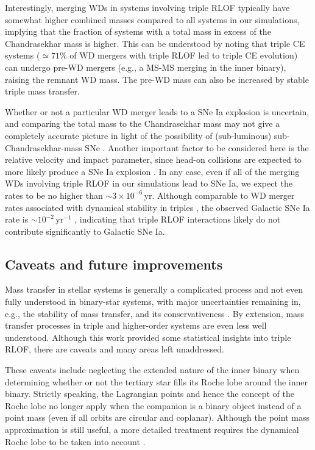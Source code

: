 \documentclass[twocolumn,appendixfloats,tighten]{aastex631}
\newcommand{\yr}{\mathrm{yr}}
\begin{document}
Interestingly, merging WDs in systems involving triple RLOF typically have somewhat higher combined masses compared to all systems in our simulations, implying that the fraction of systems with a total mass in excess of the Chandrasekhar mass is higher. This can be understood by noting that triple CE systems ($\simeq 71\%$ of WD mergers with triple RLOF led to triple CE evolution) can undergo pre-WD mergers (e.g., a MS-MS merging in the inner binary), raising the remnant WD mass. The pre-WD mass can also be increased by stable triple mass transfer. 

Whether or not a particular WD merger leads to a SNe Ia explosion is uncertain, and comparing the total mass to the Chandrasekhar mass may not give a completely accurate picture in light of the possibility of (sub-luminous) sub-Chandrasekhar-mass SNe \citep[e.g.,][]{2010ApJ...714L..52S,2012ApJ...747L..10P,2013ApJ...770L...8P,2021A&A...649A.155G}. Another important factor to be considered here is the relative velocity and impact parameter, since head-on collisions are expected to more likely produce a SNe Ia explosion \citep[e.g.,][]{2009ApJ...705L.128R,2016ApJ...826..169H}. In any case, even if all of the merging WDs involving triple RLOF in our simulations lead to SNe Ia, we expect the rates to be no higher than $\sim 3 \times 10^{-6}\,\yr$. Although comparable to WD merger rates associated with dynamical stability in triples \citep{2021arXiv210713620H}, the observed Galactic SNe Ia rate is $\sim 10^{-2}\,\yr^{-1}$ \citep{2013ApJ...778..164A}, indicating that triple RLOF interactions likely do not contribute significantly to Galactic SNe Ia. 

\subsection{Caveats and future improvements}
\label{sect:dis:cav}
Mass transfer in stellar systems is generally a complicated process and not even fully understood in binary-star systems, with major uncertainties remaining in, e.g., the stability of mass transfer, and its conservativeness \citep[e.g.,][]{2007A&A...467.1181D}. By extension, mass transfer processes in triple and higher-order systems are even less well understood. Although this work provided some statistical insights into triple RLOF, there are caveats and many areas left unaddressed. 

These caveats include neglecting the extended nature of the inner binary when determining whether or not the tertiary star fills its Roche lobe around the inner binary. Strictly speaking, the Lagrangian points and hence the concept of the Roche lobe no longer apply when the companion is a binary object instead of a point mass (even if all orbits are circular and coplanar). Although the point mass approximation is still useful, a more detailed treatment requires the dynamical Roche lobe to be taken into account \citep{2020MNRAS.491..495D}. 
\end{document}
